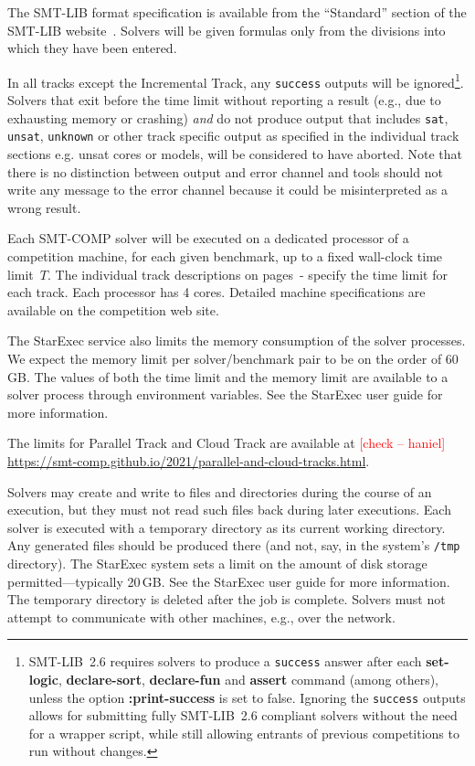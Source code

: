 \documentclass[12pt]{article}
\newcommand{\akey}[1]{\textbf{#1}\xspace}
\newcommand{\rem}[1]{\textcolor{red}{[#1]}}
\newcommand{\hb}[1]{\rem{#1 -- haniel}}
\newcommand{\inctrack}{Incremental Track\xspace}
\newcommand{\paralleltrack}{Parallel Track\xspace}
\newcommand{\cloudtrack}{Cloud Track\xspace}
\begin{document}
%
The SMT-LIB format specification is available from the ``Standard''
section of the SMT-LIB website~\cite{SMT-LIB}.  Solvers will be given
formulas only from the divisions into which they have been entered.

%
In all tracks except the \inctrack, any \texttt{success} outputs will be
ignored\footnote{SMT-LIB~2.6 requires solvers to produce a \texttt{success}
  answer after each \akey{set-logic}, \akey{declare-sort}, \akey{declare-fun}
  and \akey{assert} command (among others), unless the option
  \akey{:print-success} is set to false.  Ignoring the \texttt{success} outputs
  allows for submitting fully SMT-LIB~2.6 compliant solvers without the need for
  a wrapper script, while still allowing entrants of previous competitions to
  run without changes.}.  Solvers that exit before the time limit without
reporting a result (e.g., due to exhausting memory or crashing) \emph{and} do
not produce output that includes \texttt{sat}, \texttt{unsat}, \texttt{unknown}
or other track specific output as specified in the individual track sections
e.g. unsat cores or models, will be considered to have aborted.  Note that there
is no distinction between output and error channel and tools should not write
any message to the error channel because it could be misinterpreted as a wrong
result.

%
Each SMT-COMP solver will be executed on a dedicated processor of a
competition machine, for each given benchmark, up to a fixed
wall-clock time limit~$T$. The individual track descriptions on
pages~\pageref{sec:exec:single}-\pageref{sec:exec:model} specify
the time limit for each track. Each processor has 4 cores.  Detailed
machine specifications are available on the competition web site.

The StarExec service also limits the memory consumption of the solver
processes.  We expect the memory limit per solver/benchmark pair to be
on the order of 60\,GB.  The values of both the time limit and the
memory limit are available to a solver process through environment
variables.  See the StarExec user guide for more information.

The limits for \paralleltrack{} and \cloudtrack{} are available at \hb{check}
\url{https://smt-comp.github.io/2021/parallel-and-cloud-tracks.html}.

%
Solvers may create and write to files and directories during the
course of an execution, but they must not read such files back during
later executions.  Each solver is executed with a temporary directory
as its current working directory.  Any generated files should be
produced there (and not, say, in the system's \texttt{/tmp}
directory).  The StarExec system sets a limit on the amount of disk
storage permitted---typically 20\,GB.  See the StarExec user guide for
more information.  The temporary directory is deleted after the job is
complete.  Solvers must not attempt to communicate with other
machines, e.g., over the network.
\end{document}
